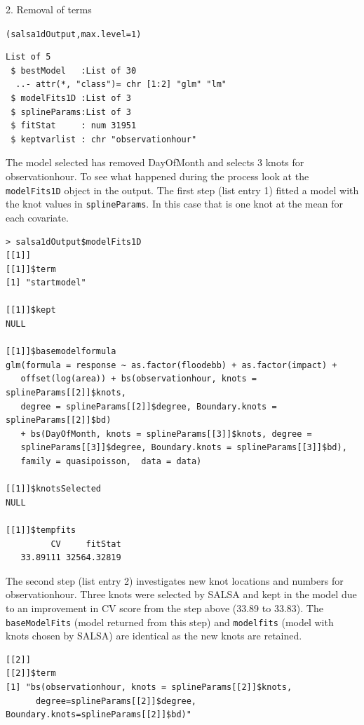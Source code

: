 \begin{block}{2. Removal of terms}
\begin{knitrout}\footnotesize
{}\color{fgcolor}\begin{kframe}
\begin{alltt}
(salsa1dOutput, max.level = 1)
\begin{verbatim}
List of 5
 $ bestModel   :List of 30
  ..- attr(*, "class")= chr [1:2] "glm" "lm"
 $ modelFits1D :List of 3
 $ splineParams:List of 3
 $ fitStat     : num 31951
 $ keptvarlist : chr "observationhour"
\end{verbatim}
\end{alltt}
\end{kframe}
\end{knitrout}

\noindent The model selected has removed DayOfMonth and selects 3 knots for observationhour. To see what happened during the process look at the {\tt modelFits1D} object in the output.  The first step (list entry 1) fitted a model with the knot values in {\tt splineParams}.  In this case that is one knot at the mean for each covariate.

\footnotesize
\begin{verbatim}
> salsa1dOutput$modelFits1D
[[1]]
[[1]]$term
[1] "startmodel"

[[1]]$kept
NULL

[[1]]$basemodelformula
glm(formula = response ~ as.factor(floodebb) + as.factor(impact) + 
   offset(log(area)) + bs(observationhour, knots = splineParams[[2]]$knots, 
   degree = splineParams[[2]]$degree, Boundary.knots = splineParams[[2]]$bd) 
   + bs(DayOfMonth, knots = splineParams[[3]]$knots, degree = 
   splineParams[[3]]$degree, Boundary.knots = splineParams[[3]]$bd), 
   family = quasipoisson,  data = data)

[[1]]$knotsSelected
NULL

[[1]]$tempfits
         CV     fitStat 
   33.89111 32564.32819 
\end{verbatim}
\normalsize

\noindent The second step (list entry 2) investigates new knot locations and numbers for observationhour.  Three knots were selected by SALSA and kept in the model due to an improvement in CV score from the step above (33.89 to 33.83).  The {\tt baseModelFits} (model returned from this step) and {\tt modelfits} (model with knots chosen by SALSA) are identical as the new knots are retained.

\footnotesize
\begin{verbatim}
[[2]]
[[2]]$term
[1] "bs(observationhour, knots = splineParams[[2]]$knots, 
      degree=splineParams[[2]]$degree, Boundary.knots=splineParams[[2]]$bd)"


\end{verbatim}
\end{block}
